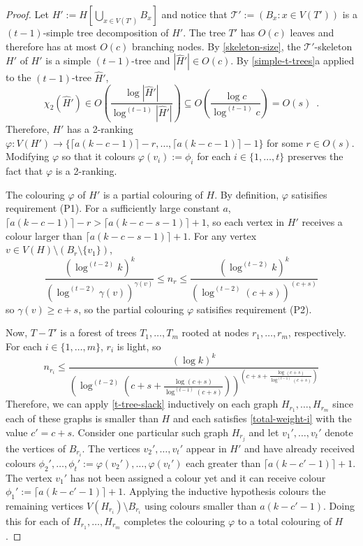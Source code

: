 \documentclass[kpfonts]{patmorin}
\newcommand{\trn}{\chi_2}
\theoremstyle{named}
\newcommand{\weirdref}[2]{\cref{#1}#2}
\begin{document}
\begin{proof}
    Let $H':=H[\bigcup_{x\in V(T')} B_x]$ and notice that $\mathcal{T}':=(B_x:x\in V(T'))$ is a $(t-1)$-simple tree decomposition of $H'$. The tree $T'$ has $O(c)$ leaves and therefore has at most $O(c)$ branching nodes. By \cref{skeleton-size}, the $\mathcal{T}'$-skeleton $\hat{H'}$ of $H'$ is a simple $(t-1)$-tree and $|\hat{H}'|\in O(c)$.  By \weirdref{simple-t-trees}{a} applied to the $(t-1)$-tree $\hat{H}'$,
    \[
       \trn(\hat{H}')\in
       O\left(\frac{\log|\hat{H}'|}{\log^{(t-1)}|\hat{H}'|}\right)
       \subseteq O\left(\frac{\log c}{\log^{(t-1)} c}\right) = O(s) \enspace .
    \]
    Therefore, $H'$ has a 2-ranking $\varphi:V(H')\to \{\lceil a(k-c-1)\rceil-r,\ldots,\lceil a(k-c-1)\rceil-1\}$ for some $r\in O(s)$. Modifying $\varphi$ so that it colours $\varphi(v_i):=\phi_i$ for each $i\in\{1,\ldots,t\}$ preserves the fact that $\varphi$ is a 2-ranking.

    The colouring $\varphi$ of $H'$ is a partial colouring of $H$. By definition, $\varphi$ satisifies requirement (P1). For a sufficiently large constant $a$, $\lceil a(k-c-1)\rceil-r > \lceil a(k-c-s-1)\rceil+1$, so each vertex in $H'$ receives a colour larger than $\lceil a(k-c-s-1)\rceil+1$.  For any vertex $v\in V(H)\setminus (B_r\setminus \{v_1\})$,
    \[ \frac{(\log^{(t-2)} k)^k}{(\log^{(t-2)}\gamma(v))^{\gamma(v)}}
         \le n_r
         \le \frac{(\log^{(t-2)} k)^k}{(\log^{(t-2)}(c+s))^{(c+s)}}
    \]
    so $\gamma(v)\ge c+s$, so the partial colouring $\varphi$ satisifies requirement (P2).

   Now, $T-T'$ is a forest of trees $T_1,\ldots,T_m$ rooted at nodes $r_1,\ldots,r_m$, respectively.
   For each $i\in\{1,\ldots,m\}$, $r_i$ is light, so
   \[
       n_{r_i} \le \frac{(\log k)^k}{
        \left(
            \log^{(t-2)}
                \left(
                   c+s+\tfrac{\log(c+s)}{\log^{(t-1)}(c+s)}
               \right)
        \right)^{\left(
           c+s+\tfrac{\log(c+s)}{\log^{(t-1)}(c+s)}
       \right)}
       }
   \]
   Therefore, we can apply \cref{t-tree-slack} inductively on each graph $H_{r_1},\ldots,H_{r_m}$ since each of these graphs is smaller than $H$ and each satisfies \cref{total-weight-i} with the value $c'=c+s$.
   Consider one particular such graph $H_{r_j}$ and let $v_1',\ldots,v_t'$ denote the vertices of $B_{r_i}$.  The vertices $v_2',\ldots,v_t'$ appear in $H'$ and have already received colours $\phi_2',\ldots,\phi_t':=\varphi(v_2'),\ldots,\varphi(v_t')$ each greater than $\lceil a(k-c'-1)\rceil+1$.  The vertex $v_1'$ has not been assigned a colour yet and it can receive colour $\phi_1':=\lceil a(k-c'-1)\rceil+1$.  Applying the inductive hypothesis colours the remaining vertices $V(H_{r_i})\setminus B_{r_i}$ using colours smaller than $a(k-c'-1)$.  Doing this for each of $H_{r_1},\ldots,H_{r_m}$ completes the colouring $\varphi$ to a total colouring of $H$.


\end{proof}
\end{document}
